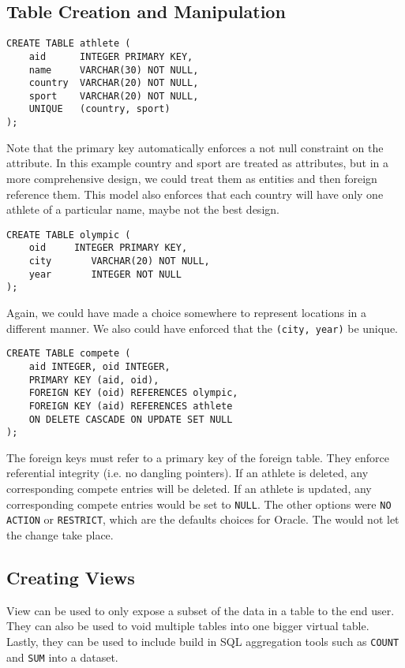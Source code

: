 \documentclass{article}
\begin{document}
\subsection{Table Creation and Manipulation}

\begin{verbatim}
CREATE TABLE athlete (
    aid      INTEGER PRIMARY KEY,
    name     VARCHAR(30) NOT NULL,
    country  VARCHAR(20) NOT NULL,
    sport    VARCHAR(20) NOT NULL,
    UNIQUE   (country, sport)
);
\end{verbatim}
Note that the primary key automatically  enforces a not null constraint on the attribute. In this example country and sport are treated as attributes, but in a more comprehensive design, we could treat them as entities and then foreign reference them. This model also enforces that each country will have only one athlete of a particular name, maybe not the best design.

\begin{verbatim}
CREATE TABLE olympic (
    oid     INTEGER PRIMARY KEY,
    city	   VARCHAR(20) NOT NULL,
    year	   INTEGER NOT NULL
);
\end{verbatim}
Again, we could have made a choice somewhere to represent locations in a different manner. We also could have enforced that the \texttt{(city, year)} be unique.

\begin{verbatim}
CREATE TABLE compete (
    aid INTEGER, oid INTEGER,
    PRIMARY KEY (aid, oid),
    FOREIGN KEY (oid) REFERENCES olympic,
    FOREIGN KEY (aid) REFERENCES athlete
    ON DELETE CASCADE ON UPDATE SET NULL
);
\end{verbatim}

The foreign keys must refer to a primary key of the foreign table. They enforce referential integrity (i.e. no dangling pointers). If an athlete is deleted, any corresponding compete entries will be deleted. If an athlete is updated, any corresponding compete entries would be set to \texttt{NULL}. The other options were \texttt{NO ACTION} or \texttt{RESTRICT}, which are the defaults choices for Oracle. The would not let the change take place.
\pagebreak
\subsection{Creating Views}

View can be used to only expose a subset of the data in a table to the end user. They can also be used to void multiple tables into one bigger virtual table. Lastly, they can be used to include build in SQL aggregation tools such as \texttt{COUNT} and \texttt{SUM} into a dataset.
\end{document}
